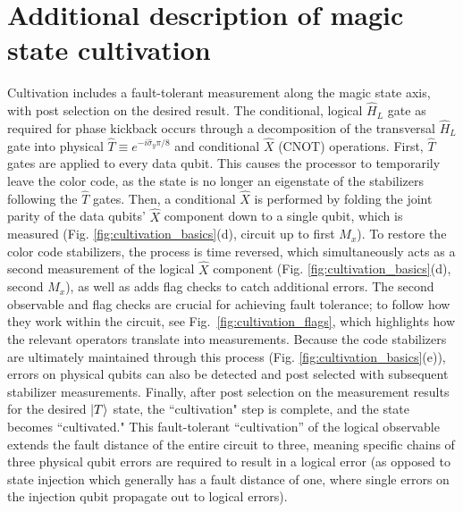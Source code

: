 \section{Additional description of magic state cultivation}
Cultivation includes a fault-tolerant measurement along the magic state axis, with post selection on the desired result. The conditional, logical $\hat{H}_L$ gate as required for phase kickback occurs through a  decomposition of the transversal $\hat{H}_L$ gate into physical $\hat{T} \equiv e^{-i \hat{\sigma}_y \pi/8}$ and conditional $\hat{X}$ (CNOT) operations. First, $\hat{T}$ gates are applied to every data qubit. This causes the processor to temporarily leave the color code, as the state is no longer an eigenstate of the stabilizers following the $\hat{T}$ gates. Then, a conditional $\hat{X}$ is performed by folding the joint parity of the data qubits' $\hat{X}$ component down to a single qubit, which is measured (Fig. \ref{fig:cultivation_basics}(d), circuit up to first $M_x$). To restore the color code stabilizers, the process is time reversed, which simultaneously acts as a second measurement of the logical $\hat{X}$ component (Fig. \ref{fig:cultivation_basics}(d), second $M_x$), as well as adds flag checks to catch additional errors. The second observable and flag checks are crucial for achieving fault tolerance; to follow how they work within the circuit, see Fig.~\ref{fig:cultivation_flags}, which highlights how the relevant operators translate into measurements. Because the code stabilizers are ultimately maintained through this process (Fig. \ref{fig:cultivation_basics}(e)), errors on physical qubits can also be detected and post selected with subsequent stabilizer measurements. Finally, after post selection on the measurement results for the desired $\ket{T}$ state, the ``cultivation" step is complete, and the state becomes ``cultivated." This fault-tolerant ``cultivation” of the logical observable extends the fault distance of the entire circuit to three, meaning specific chains of three physical qubit errors are required to result in a logical error (as opposed to state injection which generally has a fault distance of one, where single errors on the injection qubit propagate out to logical errors).
